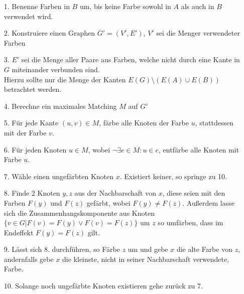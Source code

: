 \documentclass[11pt]{article}
\begin{document}
\begin{itemize}
\item[1.] Benenne Farben in $B$ um, bis keine Farbe sowohl in $A$ als auch in $B$ verwendet wird.
\item[2.] Konstruiere einen Graphen $G'=(V',E')$, $V'$ sei die Menger verwendeter Farben
\item[3.] $E'$ sei die Menge aller Paare aus Farben, welche nicht durch eine Kante in $G$ miteinander verbunden sind. \\Hierzu sollte nur die Menge der Kanten $E(G)\setminus (E(A)\cup E(B))$ betrachtet werden.
\item[4.] Berechne ein maximales Matching $M$ auf $G'$
\item[5.] Für jede Kante $(u,v)\in M$, färbe alle Knoten der Farbe $u$, stattdessen mit der Farbe $v$.
\item[6.] Für jeden Knoten $u\in M$, wobei $\neg \exists e\in M : u\in e$, entfärbe alle Knoten mit Farbe $u$.
\item[7.] Wähle einen ungefärbten Knoten $x$. Existiert keiner, so springe zu 10.
\item[8.] Finde 2 Knoten $y,z$ aus der Nachbarschaft von $x$, diese seien mit den Farben $F(y)$ und $F(z)$ gefärbt, wobei $F(y)\neq F(z)$.
Außerdem lasse sich die Zusammenhangskomponente aus Knoten $\{v\in G | F(v)=F(y) \lor F(v)=F(z)\}$ um $z$ so umfärben, dass im Endeffekt $F(y)=F(z)$ gilt.
\item[9.] Lässt sich 8. durchführen, so Färbe $z$ um und gebe $x$ die alte Farbe von $z$, andernfalls gebe $x$ die kleinste, nicht in seiner Nachbarschaft verwendete, Farbe.
\item[10.] Solange noch ungefärbte Knoten existieren gehe zurück zu 7.
\end{itemize}
\end{document}
